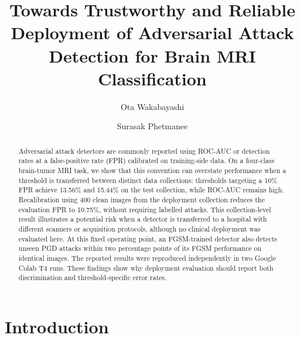 \documentclass[runningheads]{llncs}
\begin{document}
\title{Towards Trustworthy and Reliable Deployment of Adversarial Attack Detection for Brain MRI Classification}

\author{Ota Wakabayashi \and Surasak Phetmanee}

\maketitle

\begin{abstract}
Adversarial attack detectors are commonly reported using ROC-AUC or
detection rates at a false-positive rate (FPR) calibrated on
training-side data. On a four-class brain-tumor MRI task, we show that
this convention can overstate performance when a threshold is transferred
between distinct data collections: thresholds targeting a 10\% FPR
achieve 13.56\% and 15.44\% on the test collection, while
ROC-AUC remains high. Recalibration using 400 clean images from the
deployment collection reduces the evaluation FPR to 10.75\%, without
requiring labelled attacks. This collection-level result illustrates a
potential risk when a detector is transferred to a hospital with
different scanners or acquisition protocols, although no clinical
deployment was evaluated here. At this fixed operating point, an
FGSM-trained detector also detects unseen PGD attacks within two
percentage points of its FGSM performance on identical images. The
reported results were reproduced independently in two Google Colab T4
runs. These findings show why deployment evaluation should report both
discrimination and threshold-specific error rates.

\end{abstract}

\section{Introduction}
\end{document}
